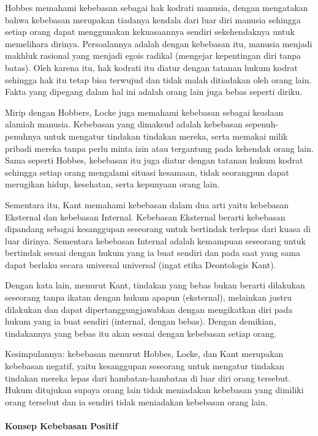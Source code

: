\documentclass[10pt,a4paper]{article}
\begin{document}
\begin{multicols}{2}
Hobbes memahami kebebasan sebagai hak kodrati manusia, dengan mengatakan
bahwa kebebasan merupakan tiadanya kendala dari luar diri manusia
sehingga setiap orang dapat menggunakan kekuasaannya sendiri
sekehendaknya untuk memelihara dirinya. Persoalannya adalah dengan
kebebasan itu, manusia menjadi makhluk rasional yang menjadi egois
radikal (mengejar kepentingan diri tanpa batas). Oleh karena itu, hak
kodrati itu diatur dengan tatanan hukum kodrat sehingga hak itu tetap
bisa terwujud dan tidak malah ditiadakan oleh orang lain. Fakta yang
dipegang dalam hal ini adalah orang lain juga bebas seperti diriku.

Mirip dengan Hobbers, Locke juga memahami kebebasan sebagai keadaan
alamiah manusia. Kebebasan yang dimaksud adalah kebebasan
sepenuh-penuhnya untuk mengatur tindakan tindakan mereka, serta memakai
milik pribadi mereka tanpa perlu minta izin atau tergantung pada
kehendak orang lain. Sama seperti Hobbes, kebebasan itu juga diatur
dengan tatanan hukum kodrat sehingga setiap orang mengalami situasi
kesamaan, tidak seorangpun dapat merugikan hidup, kesehatan, serta
kepunyaan orang lain.

Sementara itu, Kant memahami kebebasan dalam dua arti yaitu kebebasan
Eksternal dan kebebasan Internal. Kebebasan Eksternal berarti kebebasan
dipandang sebagai kesanggupan seseorang untuk bertindak terlepas dari
kuasa di luar dirinya. Sementara kebebasan Internal adalah kemampuan
seseorang untuk bertindak sesuai dengan hukum yang ia buat sendiri dan
pada saat yang sama dapat berlaku secara universal universal (ingat
etika Deontologis Kant).

Dengan kata lain, menurut Kant, tindakan yang bebas bukan berarti
dilakukan seseorang tanpa ikatan dengan hukum apapun (eksternal),
melainkan justru dilakukan dan dapat dipertanggungjawabkan dengan
mengikatkan diri pada hukum yang ia buat sendiri (internal, dengan
bebas). Dengan demikian, tindakannya yang bebas itu akan sesuai dengan
kebebasan setiap orang.

Kesimpulannya: kebebasan menurut Hobbes, Locke, dan Kant merupakan
kebebasan negatif, yaitu kesanggupan seseorang untuk mengatur tindakan
tindakan mereka lepas dari hambatan-hambatan di luar diri orang
tersebut. Hukum ditujukan supaya orang lain tidak meniadakan kebebasan
yang dimiliki orang tersebut dan ia sendiri tidak meniadakan kebebasan
orang lain.

\hypertarget{konsep-kebebasan-positif}{%
\paragraph{Konsep Kebebasan Positif}\label{konsep-kebebasan-positif}}


\end{multicols}
\end{document}

